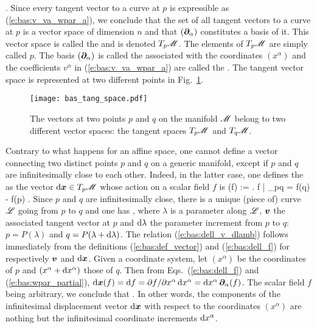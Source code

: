 \be \label{e:bas:v_va_wpar_a}
   .
\ee
Since every tangent vector to a curve at $p$ is expressible as (\ref{e:bas:v_va_wpar_a}), we conclude that
the set of all tangent vectors to a curve at $p$ is a vector space of dimension $n$ and that $(\bm{\partial}_\alpha)$ constitutes a basis of it. This vector space is
called the
 and is denoted $T_p\mathscr{M}$.
The elements of $T_p\mathscr{M}$ are simply called  $p$.
The basis $(\bm{\partial}_\alpha)$ is called the  associated with
the coordinates $(x^\alpha)$ and the coefficients $v^\alpha$ in (\ref{e:bas:v_va_wpar_a}) are called the .
The tangent vector space is represented at two different points in Fig.~\ref{f:bas:tang_space}.

\begin{figure}
\centerline{\texttt{[image: bas\_tang\_space.pdf]}}
\caption[]{\label{f:bas:tang_space} \footnotesize
The vectors at two points $p$ and $q$ on the
manifold $\mathscr{M}$ belong to two different vector spaces:
the tangent spaces $T_p\mathscr{M}$ and $T_q\mathscr{M}$.}
\end{figure}

Contrary to what happens for an affine space, one cannot define a vector connecting two distinct points $p$ and $q$ on a generic manifold, except if $p$ and $q$ are infinitesimally close to each other. Indeed, in the latter case, one defines
the  as the vector $\mathrm{d}\bm{x}\in{{T_p\mathscr{M}}}$ whose action on a scalar field $f$ is
\be \label{e:bas:dell_f}
  \D{}(f) := \left. \D f \right| _{p\rightarrow q} = f(q) - f(p) .
\ee
Since $p$ and $q$ are infinitesimally close, there is a unique (piece of) curve
$\mathscr{L}$ going
from $p$ to $q$ and one has
\be \label{e:bas:dell_v_dlamb}
  ,
\ee
where $\lambda$ is a parameter along $\mathscr{L}$, $\bm{v}$ the associated tangent
vector at $p$ and $\mathrm{d}\lambda$ the parameter
increment from $p$ to $q$: $p=P(\lambda)$ and $q=P(\lambda+\mathrm{d}\lambda)$.
The relation (\ref{e:bas:dell_v_dlamb}) follows immediately from the definitions
(\ref{e:bas:def_vector}) and (\ref{e:bas:dell_f}) for respectively $\bm{v}$ and $\mathrm{d}\bm{x}$.
Given a coordinate system, let $(x^\alpha)$ be the coordinates
of $p$ and $(x^\alpha+\mathrm{d} x^\alpha)$ those of $q$. Then from Eqs.~(\ref{e:bas:dell_f})
and (\ref{e:bas:wpar_partial}),
$\mathrm{d}\bm{x}(f) =   \mathrm{d} f  = {\partial f}/{\partial x^\alpha} \, \mathrm{d} x^\alpha
  = \mathrm{d} x^\alpha \, \bm{\partial}_\alpha(f)$.
The scalar field $f$ being arbitrary, we conclude that
\be \label{e:bas:dell_dxa_wpar}
   .
\ee
In other words, the components of the infinitesimal displacement vector $\mathrm{d}\bm{x}$ with respect
to the coordinates $(x^\alpha)$ are nothing but the infinitesimal coordinate
increments $\mathrm{d} x^\alpha$.

